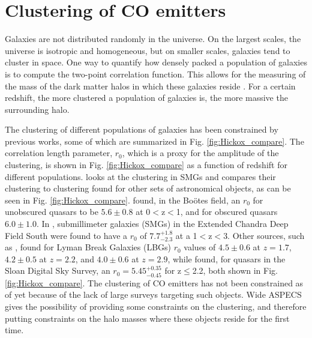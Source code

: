 \chapter{Clustering of CO emitters}

Galaxies are not distributed randomly in the universe. On the largest scales, the universe is isotropic and homogeneous, but on smaller scales, galaxies tend to cluster in space. One way to quantify how densely packed a population of galaxies is to compute the two-point correlation function. This allows for the measuring of the mass of the dark matter halos in which these galaxies reside \cite{hickox2011clustering}. For a certain redshift, the more clustered a population of galaxies is, the more massive the surrounding halo.

The clustering of different populations of galaxies has been constrained by previous works, some of which are summarized in Fig. \ref{fig:Hickox_compare}. The correlation length parameter, $r_0$, which is a proxy for the amplitude of the clustering, is shown in Fig. \ref{fig:Hickox_compare} as a function of redshift for different populations. \cite{10.1111/j.1365-2966.2011.20303.x} looks at the clustering in SMGs and compares their clustering to clustering found for other sets of astronomical objects, as can be seen in Fig. \ref{fig:Hickox_compare}. \cite{hickox2011clustering} found, in the Bo\"otes field, an $r_0$ for unobscured quasars to be $5.6 \pm 0.8$ at 0$<$z$<$1, and for obscured quasars $6.0 \pm 1.0 $. In \cite{10.1111/j.1365-2966.2011.20303.x}, submillimeter galaxies (SMGs) in the Extended Chandra Deep Field South were found to have a $r_0$ of $7.7_{-2.3}^{+1.8}$ at a 1$<$z$<$3. Other sources, such as \cite{adelberger2005spatial}, found for Lyman Break Galaxies (LBGs) $r_0$ values of $4.5 \pm 0.6$ at $z = 1.7$, $4.2 \pm 0.5$ at $z = 2.2$, and $4.0 \pm 0.6$ at $z = 2.9$, while \cite{ross2009clustering} found, for quasars in the Sloan Digital Sky Survey, an $r_0 = 5.45_{-0.45}^{+0.35}$ for z$\leq$2.2, both shown in Fig. \ref{fig:Hickox_compare}. The clustering of CO emitters has not been constrained as of yet because of the lack of large surveys targeting such objects. Wide ASPECS gives the possibility of providing some constraints on the clustering, and therefore putting constraints on the halo masses where these objects reside for the first time.

